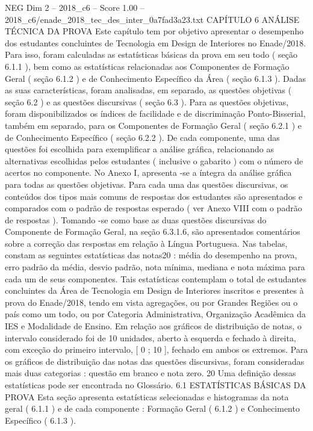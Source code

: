 \begin{textsample}{NEG Dim 2 – 2018\_c6 – Score 1.00 – 2018\_c6/enade\_2018\_tec\_des\_inter\_0a7fad3a23.txt}  \label{ex:f2_neg_242}
CAPÍTULO 6 ANÁLISE TÉCNICA DA PROVA Este capítulo tem por objetivo apresentar o desempenho dos estudantes concluintes de Tecnologia em Design de Interiores no Enade/2018.
Para isso, foram calculadas as estatísticas básicas da prova em seu todo ( seção 6.1.1 ), bem como as estatísticas relacionadas aos Componentes de Formação Geral ( seção 6.1.2 ) e de Conhecimento Específico da Área ( seção 6.1.3 ).
Dadas as suas características, foram analisadas, em separado, as questões objetivas ( seção 6.2 ) e as questões discursivas ( seção 6.3 ).
Para as questões objetivas, foram disponibilizados os índices de facilidade e de discriminação Ponto-Bisserial, também em separado, para os Componentes de Formação Geral ( seção 6.2.1 ) e de Conhecimento Específico ( seção 6.2.2 ).
De cada componente, uma das questões foi escolhida para exemplificar a análise gráfica, relacionando as alternativas escolhidas pelos estudantes ( inclusive o gabarito ) com o número de acertos no componente.
No Anexo I, apresenta -se a íntegra da análise gráfica para todas as questões objetivas.
Para cada uma das questões discursivas, os conteúdos dos tipos mais comuns de respostas dos estudantes são apresentados e comparados com o padrão de respostas esperado ( ver Anexo VIII com o padrão de respostas ).
Tomando -se como base as duas questões discursivas do Componente de Formação Geral, na seção 6.3.1.6, são apresentados comentários sobre a correção das respostas em relação à Língua Portuguesa.
Nas tabelas, constam as seguintes estatísticas das notas20 : média do desempenho na prova, erro padrão da média, desvio padrão, nota mínima, mediana e nota máxima para cada um de seus componentes.
Tais estatísticas contemplam o total de estudantes concluintes da Área de Tecnologia em Design de Interiores inscritos e presentes à prova do Enade/2018, tendo em vista agregações, ou por Grandes Regiões ou o país como um todo, ou por Categoria Administrativa, Organização Acadêmica da IES e Modalidade de Ensino.
Em relação aos gráficos de distribuição de notas, o intervalo considerado foi de 10 unidades, aberto à esquerda e fechado à direita, com exceção do primeiro intervalo, [ 0 ; 10 ], fechado em ambos os extremos.
Para os gráficos de distribuição das notas das questões discursivas, foram consideradas mais duas categorias : questão em branco e nota zero. 20 Uma definição dessas estatísticas pode ser encontrada no Glossário. 6.1 ESTATÍSTICAS BÁSICAS DA PROVA Esta seção apresenta estatísticas selecionadas e histogramas da nota geral ( 6.1.1 ) e de cada componente : Formação Geral ( 6.1.2 ) e Conhecimento Específico ( 6.1.3 ).

\end{textsample}
